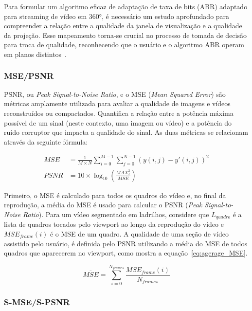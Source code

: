 {Para formular um algoritmo eficaz de adaptação de taxa de bits (ABR) adaptado para streaming de vídeo em 360°, é necessário um estudo aprofundado para compreender a relação entre a qualidade da janela de visualização e a qualidade da projeção. Esse mapeamento torna-se crucial no processo de tomada de decisão para troca de qualidade, reconhecendo que o usuário e o algoritmo ABR operam em planos distintos~\cite{tran2017, Xu2020}.

\subsubsection{MSE/PSNR}

PSNR, ou \textit{Peak Signal-to-Noise Ratio}, e o MSE (\textit{Mean Squared Error}) são métricas amplamente utilizada para avaliar a qualidade de imagens e vídeos reconstruídos ou compactados. Quantifica a relação entre a potência máxima possível de um sinal (neste contexto, uma imagem ou vídeo) e a potência do ruído corruptor que impacta a qualidade do sinal. As duas métricas se relacionam através da seguinte fórmula:

\begin{align}
        \label{MSE}
        MSE&= \frac{1}{M\times N}\sum^{M-1}_{i=0}\sum^{N-1}_{j=0} \left(y(i,j) - y'(i,j)\right)^2 \\
        \label{PSNR}
        PSNR&=10 \times \log_{10}\left(\frac{MAX^2_I}{MSE}\right)
\end{align}

Primeiro, o MSE é calculado para todos os quadros do vídeo e, no final da reprodução, a média do MSE é usado para calcular o PSNR (\textit{Peak Signal-to-Noise Ratio}). Para um vídeo segmentado em ladrilhos, considere que $L_{quadro} $ é a lista de quadros tocados pelo viewport ao longo da reprodução do vídeo e $MSE_{frame}(i)$ é o MSE de um quadro. A qualidade de uma seção de vídeo assistido pelo usuário, é definida pelo PSNR utilizando a média do MSE de todos quadros que aparecerem no viewport, como mostra a equação~\ref{eq:agerage_MSE}.

\begin{equation}
        \bar{MSE} = \sum^{N_{frames}}_{i=0} \dfrac{MSE_{frame}(i)}{N_{frames}}
        \label{eq:agerage_MSE}
\end{equation}

\subsubsection{S-MSE/S-PSNR}

}
